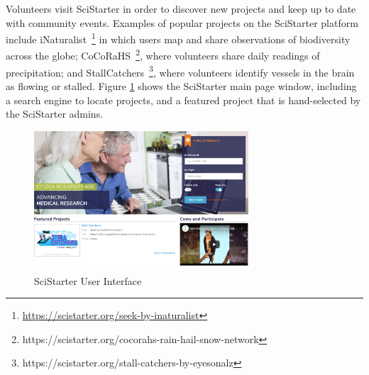\documentclass[letterpaper]{article} %
\begin{document}
      Volunteers visit SciStarter in order to discover new projects and keep up to date with   community events.  
       Examples of popular projects on the SciStarter platform include iNaturalist~\footnote{\url{https://scistarter.org/seek-by-inaturalist}} in which users map and share observations of biodiversity across the globe; CoCoRaHS~\footnote{https://scistarter.org/cocorahs-rain-hail-snow-network}, where volunteers share daily readings of precipitation; and StallCatchers~\footnote{https://scistarter.org/stall-catchers-by-eyesonalz}, where volunteers identify vessels in the brain as flowing or stalled. 
      Figure \ref{fig:ui} shows the  SciStarter main page window, including a search engine to locate projects, and a featured project that is hand-selected 
      by the SciStarter admins. 

      
      

\begin{figure}[t]
\centering
\includegraphics[width=8cm]{Figs/SciStarterUI.PNG}
\caption{SciStarter User Interface}
\label{fig:ui}
\end{figure}

  
  
\end{document}

